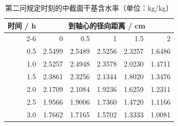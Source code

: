 \begin{table}[htbp]
  \centering
  \caption{第二问规定时刻的中截面干基含水率（单位：kg/kg）}
  \label{tab:q2-moisture}
  \small
  \begin{tabular}{rrrrrr}
    \toprule
    时间 / h & \multicolumn{5}{c}{到轴心的径向距离 / cm} \\
    \cmidrule(lr){2-6}
    & 0 & 0.5 & 1 & 1.5 & 2 \\
    \midrule
    0.5 & 2.5499 & 2.5489 & 2.5256 & 2.3257 & 1.6486 \\
    1.0 & 2.5257 & 2.4948 & 2.3578 & 2.0230 & 1.4711 \\
    1.5 & 2.3861 & 2.3256 & 2.1344 & 1.8020 & 1.3476 \\
    2.0 & 2.1709 & 2.1084 & 1.9236 & 1.6259 & 1.2311 \\
    2.5 & 1.9566 & 1.9006 & 1.7360 & 1.4720 & 1.1166 \\
    3.0 & 1.7662 & 1.7165 & 1.5702 & 1.3333 & 1.0081 \\
    \bottomrule
  \end{tabular}
\end{table}
